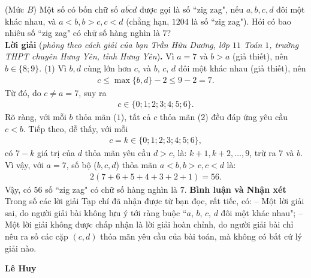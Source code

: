 \begin{multicols}{2}
	\setlength{\abovedisplayskip}{4pt}
	\setlength{\belowdisplayskip}{4pt}
	{}
	(Mức $B$) Một số có bốn chữ số $\overline{a b c d}$ được gọi là số ``zig zag", nếu $a, b, c, d$ đôi một khác nhau, và $a<b, b>c, c<d$ (chẳng hạn, $1204$ là số ``zig zag"). Hỏi có bao nhiêu số ``zig zag" có chữ số hàng nghìn là $7$?\\
	\textbf{\color{thachthuctoanhoc}Lời giải} (\textit{phỏng theo cách giải của bạn Trần Hữu Dương, lớp $11$ Toán $1$, trường THPT chuyên Hưng Yên, tỉnh Hưng Yên})\textbf{\color{thachthuctoanhoc}.}
	\vskip 0.05cm
	Vì $a = 7$ và $b > a$ (giả thiết), nên \linebreak $b \in \{8; 9\}$. \hfill ($1$)
	\vskip 0.05cm
	Vì $b, d$ cùng lớn hơn $c$, và $b$, $c$, $d$ đôi một khác nhau (giả thiết), nên
	\begin{align*}
		c \le \max\{b, d\} - 2 \le 9 - 2 = 7.
	\end{align*}
	Từ đó, do $c \ne a = 7$, suy ra 
	\begin{align*}
		c \in \{0; 1; 2; 3;4; 5; 6\}. \tag{$2$}
	\end{align*}
	Rõ ràng, với mỗi $b$ thỏa mãn ($1$), tất cả $c$ thỏa mãn ($2$) đều đáp ứng yêu cầu $c < b$.
	\vskip 0.05cm
	Tiếp theo, dễ thấy, với mỗi 
	\begin{align*}
		c = k \in \{0; 1; 2;3; 4; 5; 6\},
	\end{align*}
	có $7 - k$ giá trị của $d$ thỏa mãn yêu cầu $d > c$, là: $k \!+\! 1, k \!+\! 2, \ldots, 9$, trừ ra $7$ và $b$.
	\vskip 0.05cm
	Vì vậy, với $a = 7$, số bộ ($b, c, d$) thỏa mãn $a < b, b > c, c < d$ là:
	\begin{align*}
		2(7 + 6 + 5 + 4 + 3 + 2 + 1) = 56.
	\end{align*}
	Vậy, có $56$ số ``zig zag" có chữ số hàng nghìn là $7$.
	\vskip 0.05cm
	\textbf{\color{thachthuctoanhoc}Bình luận và Nhận xét}
	\vskip 0.05cm	
	Trong số các lời giải Tạp chí đã nhận được từ bạn đọc, rất tiếc, có:
	\vskip 0.05cm
	-- Một lời giải sai, do người giải bài không lưu ý tới ràng buộc ``$a$, $b$, $c$, $d$ đôi một khác nhau";
	\vskip 0.05cm
	-- Một lời giải không được chấp nhận là lời giải hoàn chỉnh, do người giải bài chỉ nêu ra số các cặp $(c, d)$ thỏa mãn yêu cầu của bài toán, mà không có bất cứ lý giải nào.
	\begin{flushright}
		\textbf{\color{thachthuctoanhoc}Lê Huy}
	\end{flushright}
	{}

\end{multicols}
